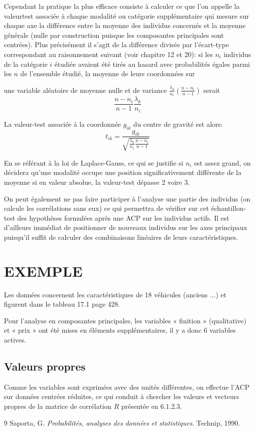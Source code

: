 \documentclass[12pt,a4paper]{article}
\begin{document}
Cependant la pratique la plus efficace consiste à calculer ce que l'on appelle la valeurtest associée à chaque modalité ou catégorie supplémentaire qui mesure sur chaque axe
la différence entre la moyenne des individus concernés et la moyenne générale (nulle
par construction puisque les composantes principales sont centrées). Plus précisément il
s'agit de la différence divisée par l'écart-type correspondant au raisonnement suivant (voir
chapitre 12 et 20): si les $n_i$ individus de la catégorie $i$ étudiée avaient été tirés au hasard avec
probabilités égales parmi les $n$ de l'ensemble étudié, la moyenne de leurs coordonnées sur

une variable aléatoire de moyenne nulle et de variance $\frac{\lambda_k}{n_i} (\frac{n - n_i}{n - 1})$ serait
\[\frac{n - n_i}{n - 1} \frac{\lambda_k}{n_i}\]

La valeur-test associée à la coordonnée $g_{i k}$ du centre de gravité est alors:
\[t_{i k} = \frac{g_{i k}}{\sqrt{\frac{\lambda_k}{n_i} \frac{n - n_i}{n - 1}}}\]

En se référant à la loi de Laplace-Gauss, ce qui se justifie si $n_i$ est assez grand, on décidera qu'une modalité occupe une position significativement différente de la moyenne si en valeur absolue, la valeur-test dépasse 2 voire 3.

On peut également ne pas faire participer à l'analyse une partie des individus (on calcule
les corrélations sans eux) ce qui permettra de vérifier sur cet échantillon-test des hypothèses
formulées après une ACP sur les individus actifs. Il est d'ailleurs immédiat de positionner de
nouveaux individus sur les axes principaux puisqu'il suffit de calculer des combinaisons
linéaires de leurs caractéristiques.

\section{EXEMPLE}

Les données concernent les caractéristiques de 18 véhicules (anciens ...) et figurent dans
le tableau 17.1 page 428.

Pour l'analyse en composantes principales, les variables « finition » (qualitative) et « prix »
ont été mises en éléments supplémentaires, il y a donc 6 variables actives.

\subsection{Valeurs propres}

Comme les variables sont exprimées avec des unités différentes, on effectue l'ACP sur
données centrées réduites, ce qui conduit à chercher les valeurs et vecteurs propres de la
matrice de corrélation $R$ présentée en 6.1.2.3.

\begin{thebibliography}{9}
Saporta, G. \textit{Probabilités, analyses des données et statistiques}. Technip, 1990.
\end{thebibliography}
\end{document}
